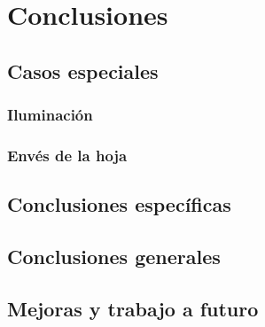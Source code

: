 \chapter{Conclusiones}

\section{Casos especiales}

\subsection{Iluminación}

\subsection{Envés de la hoja}

\section{Conclusiones específicas}

\section{Conclusiones generales}

\section{Mejoras y trabajo a futuro}